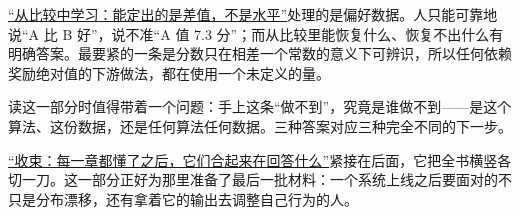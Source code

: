 \hyperref[ch:145]{``从比较中学习：能定出的是差值，不是水平''}处理的是偏好数据。人只能可靠地说``A 比 B 好''，说不准``A 值 7.3 分''；而从比较里能恢复什么、恢复不出什么有明确答案。最要紧的一条是分数只在相差一个常数的意义下可辨识，所以任何依赖奖励绝对值的下游做法，都在使用一个未定义的量。

读这一部分时值得带着一个问题：手上这条``做不到''，究竟是谁做不到——是这个算法、这份数据，还是任何算法任何数据。三种答案对应三种完全不同的下一步。

\hyperref[ch:147]{``收束：每一章都懂了之后，它们合起来在回答什么''}紧接在后面，它把全书横竖各切一刀。这一部分正好为那里准备了最后一批材料：一个系统上线之后要面对的不只是分布漂移，还有拿着它的输出去调整自己行为的人。
